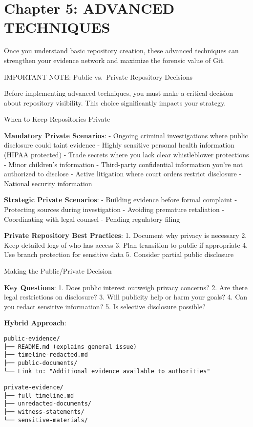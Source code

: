 \section{Chapter 5: ADVANCED
TECHNIQUES}\label{chapter-5-advanced-techniques}

Once you understand basic repository creation, these advanced techniques
can strengthen your evidence network and maximize the forensic value of
Git.

IMPORTANT NOTE: Public vs.~Private Repository Decisions

Before implementing advanced techniques, you must make a critical
decision about repository visibility. This choice significantly impacts
your strategy.

When to Keep Repositories Private

\textbf{Mandatory Private Scenarios}: - Ongoing criminal investigations
where public disclosure could taint evidence - Highly sensitive personal
health information (HIPAA protected) - Trade secrets where you lack
clear whistleblower protections - Minor children's information -
Third-party confidential information you're not authorized to disclose -
Active litigation where court orders restrict disclosure - National
security information

\textbf{Strategic Private Scenarios}: - Building evidence before formal
complaint - Protecting sources during investigation - Avoiding premature
retaliation - Coordinating with legal counsel - Pending regulatory
filing

\textbf{Private Repository Best Practices}: 1. Document why privacy is
necessary 2. Keep detailed logs of who has access 3. Plan transition to
public if appropriate 4. Use branch protection for sensitive data 5.
Consider partial public disclosure

Making the Public/Private Decision

\textbf{Key Questions}: 1. Does public interest outweigh privacy
concerns? 2. Are there legal restrictions on disclosure? 3. Will
publicity help or harm your goals? 4. Can you redact sensitive
information? 5. Is selective disclosure possible?

\textbf{Hybrid Approach}:

\begin{verbatim}
public-evidence/
├── README.md (explains general issue)
├── timeline-redacted.md
├── public-documents/
└── Link to: "Additional evidence available to authorities"

private-evidence/
├── full-timeline.md
├── unredacted-documents/
├── witness-statements/
└── sensitive-materials/
\end{verbatim}


